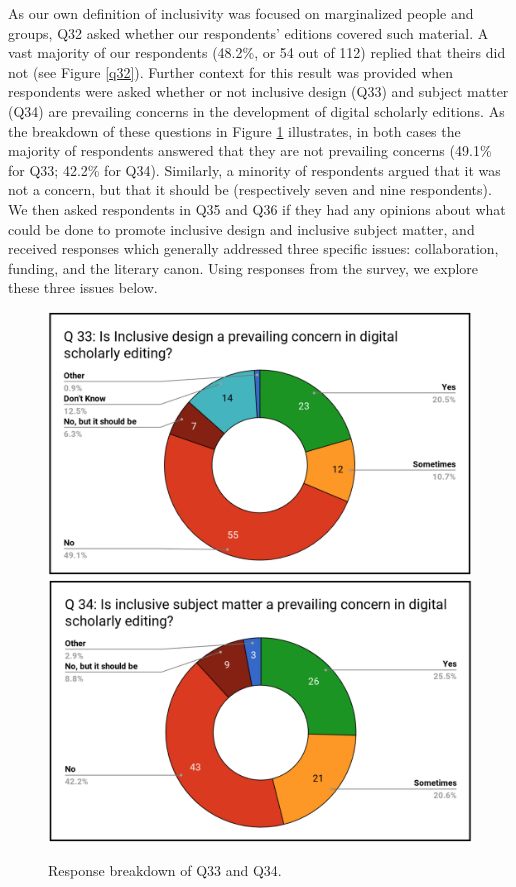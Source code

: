 \begin{paper}
As our own definition of inclusivity was focused on marginalized people
and groups, Q32 asked whether our respondents' editions covered such
material. A vast majority of our respondents (48.2\%, or 54 out of 112)
replied that theirs did not (see Figure \ref{q32}). Further context for this result was provided when respondents were asked whether or not inclusive
design (Q33) and subject matter (Q34) are prevailing concerns in the
development of digital scholarly editions. As the breakdown of these
questions in Figure \ref{q33} illustrates, in both cases the majority of
respondents answered that they are not prevailing concerns (49.1\% for
Q33; 42.2\% for Q34). Similarly, a minority of respondents argued that
it was not a concern, but that it should be (respectively seven and nine
respondents). We then asked respondents in Q35 and Q36 if they had any
opinions about what could be done to promote inclusive design and
inclusive subject matter, and received responses which generally
addressed three specific issues: collaboration, funding, and the
literary canon. Using responses from the survey, we explore these three
issues below.

\begin{figure}[p!]
\includegraphics[width=\textwidth]{media/martinez7a.png}\\
\includegraphics[width=\textwidth]{media/martinez7b.png}
\caption{Response breakdown of Q33 and Q34.}
\label{q33}
\end{figure}


\end{paper}
